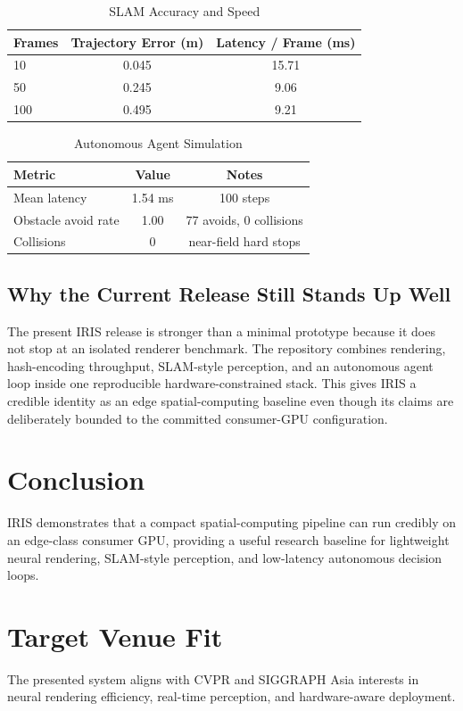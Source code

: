 \documentclass[conference]{IEEEtran}
\begin{document}
\begin{table}[h]
\caption{SLAM Accuracy and Speed}
\centering
\begin{tabular}{lcc}
\hline
Frames & Trajectory Error (m) & Latency / Frame (ms) \\
\hline
10 & 0.045 & 15.71 \\
50 & 0.245 & 9.06 \\
100 & 0.495 & 9.21 \\
\hline
\end{tabular}
\end{table}

\begin{table}[h]
\caption{Autonomous Agent Simulation}
\centering
\begin{tabular}{lcc}
\hline
Metric & Value & Notes \\
\hline
Mean latency & 1.54 ms & 100 steps \\
Obstacle avoid rate & 1.00 & 77 avoids, 0 collisions \\
Collisions & 0 & near-field hard stops \\
\hline
\end{tabular}
\end{table}

\subsection{Why the Current Release Still Stands Up Well}
The present IRIS release is stronger than a minimal prototype because it does
not stop at an isolated renderer benchmark. The repository combines rendering,
hash-encoding throughput, SLAM-style perception, and an autonomous agent loop
inside one reproducible hardware-constrained stack. This gives IRIS a credible
identity as an edge spatial-computing baseline even though its claims are
deliberately bounded to the committed consumer-GPU configuration.

\section{Conclusion}
IRIS demonstrates that a compact spatial-computing pipeline can run credibly on
an edge-class consumer GPU, providing a useful research baseline for
lightweight neural rendering, SLAM-style perception, and low-latency autonomous
decision loops.

\section{Target Venue Fit}
The presented system aligns with CVPR and SIGGRAPH Asia interests in neural rendering efficiency, real-time perception, and hardware-aware deployment.
\end{document}
